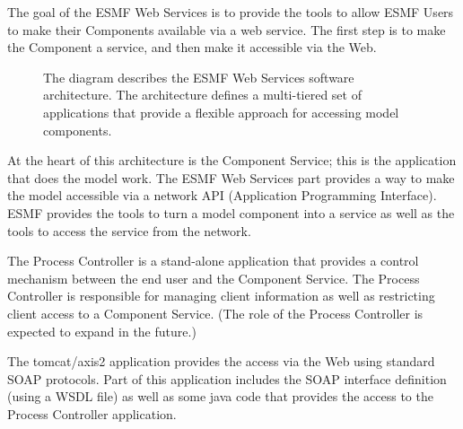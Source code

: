 %


The goal of the ESMF Web Services is to provide the tools to allow ESMF Users to make 
their Components available via a web service.  The first step is to make the Component 
a service, and then make it accessible via the Web.  

\begin{center}
\begin{figure}
\caption{The diagram describes the ESMF Web Services software architecture. The architecture
defines a multi-tiered set of applications that provide a flexible approach for accessing
model components.}
\label{fig:webservices_fig}
\end{figure}
\end{center}

At the heart of this architecture is the Component Service; this is the 
application that does the model work.  The ESMF Web Services part provides a way to make 
the model accessible via a network API (Application Programming Interface). ESMF provides 
the tools to turn a model component into a service as well as the tools to access the 
service from the network. 

The Process Controller is a stand-alone application that provides a control mechanism between 
the end user and the Component Service.  The Process Controller is responsible for managing 
client information as well as restricting client access to a Component Service.  
(The role of the Process Controller is expected to expand in the future.)

The tomcat/axis2 application provides the access via the Web using standard SOAP 
protocols. Part of this application includes the SOAP interface definition 
(using a WSDL file) as well as some java code that provides the access to the Process 
Controller application.

